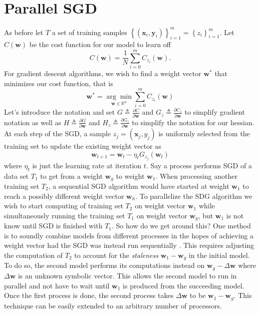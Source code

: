\section{Parallel SGD}
As before let $T$ a set of training samples $\left\lbrace \left( \bm{x}_{i}, \bm{y}_i \right) \right\rbrace_{i=1}^{m} = \left\lbrace z_{i} \right\rbrace_{i=1}^{m}$. Let $C \left( \bm{w} \right)$ be the cost function for our model to learn off
\[
    C \left( \bm{w} \right) = \frac{1}{N} \sum_{i=0}^{m} C_{z_{i}}\left( \bm{w} \right).
\]
For gradient descent algorithms, we wish to find a weight vector $\bm{w}^{\ast}$ that minimizes our cost function, that is
\[
    \bm{w}^{\ast} = \underset{\bm{w} \in \mathbb{R}^{n}}{\arg \min } \sum_{i=0}^{m} C_{z_{i}}\left( \bm{w} \right)
\]
Let's introduce the notation and set $G \triangleq \frac{\partial C}{\partial \bm{w}}$ and $G_{z} \triangleq \frac{\partial C_{z}}{\partial \bm{w}}$ to simplify gradient notation as well as $H \triangleq \frac{\partial G}{\partial \bm{w}}$ and $H_{z} \triangleq \frac{\partial G_{z}}{\partial \bm{w}}$ to simplify the notation for our hessian. At each step of the SGD, a sample $z_{j} = \left( \bm{x}_j , y_{j} \right)$ is uniformly selected from the training set to update the existing weight vector as
\[
    \bm{w}_{t+1} = \bm{w}_{t} - \eta_{t} G_{z_{j}} \left( \bm{w}_{t} \right)
\]
where $\eta_{t}$ is just the learning rate at iteration $t$. Say a process performs SGD of a data set $T_{1}$ to get from a weight $\bm{w}_{g}$ to weight $\bm{w}_{1}$. When processing another training set $T_{2}$, a sequential SGD algorithm would have started at weight $\bm{w}_{1}$ to reach a possibly different weight vector $\bm{w}_{h}$. To parallelize the SDG algorithm we wish to start computing of training set $T_2$ on weight vector $\bm{w}_{1}$ while simultaneously running the training set $T_1$ on weight vector $\bm{w}_{g}$, but $\bm{w}_{1}$ is not know until SGD is finished with $T_1$. So how do we get around this? One method is to soundly combine models from different processes in the hopes of achieving a weight vector had the SGD was instead run sequentially \cite{MalekiSaeed2017PSGD}. This requires adjusting the computation of $T_2$ to account for the {\it staleness} $\bm{w}_{1} - \bm{w}_{g}$ in the initial model. To do so, the second model performs its computations instead on $\bm{w}_{g} - \Delta \bm{w}$ where $\Delta \bm{w}$ is an unknown symbolic vector. This allows the second model to run in parallel and not have to wait until $\bm{w}_{1}$ is produced from the succeeding model. Once the first process is done, the second process takes $\Delta \bm{w}$ to be $\bm{w}_{1} - \bm{w}_{g}$. This technique can be easily extended to an arbitrary number of processors.\\[1\baselineskip]
